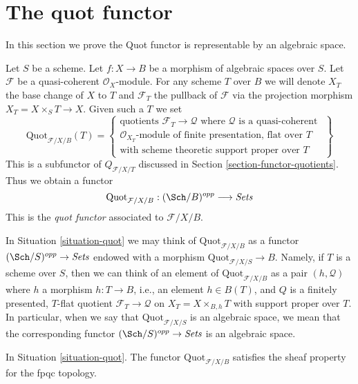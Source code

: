 \section{The quot functor}
\label{section-quot}

\noindent
In this section we prove the Quot functor is representable by
an algebraic space.

\begin{situation}
\label{situation-quot}
Let $S$ be a scheme. Let $f : X \to B$ be a morphism of
algebraic spaces  over $S$. Let $\mathcal{F}$ be a quasi-coherent
$\mathcal{O}_X$-module.
For any scheme $T$ over $B$ we will denote $X_T$ the base change of
$X$ to $T$ and $\mathcal{F}_T$ the pullback
of $\mathcal{F}$ via the projection morphism $X_T = X \times_S T \to X$.
Given such a $T$ we set
$$
\text{Quot}_{\mathcal{F}/X/B}(T) =
\left\{
\begin{matrix}
\text{quotients }\mathcal{F}_T \to \mathcal{Q}\text{ where }
\mathcal{Q}\text{ is a quasi-coherent }\\
\mathcal{O}_{X_T}\text{-module of finite presentation, flat over }T\\
\text{with scheme theoretic support proper over }T
\end{matrix}
\right\}
$$
This is a subfunctor of $Q_{\mathcal{F}/X/T}$ discussed in
Section \ref{section-functor-quotients}. Thus we obtain a functor
\begin{equation}
\label{equation-quot}
\text{Quot}_{\mathcal{F}/X/B} : (\Sch/B)^{opp} \longrightarrow \textit{Sets}
\end{equation}
This is the {\it quot functor} associated to $\mathcal{F}/X/B$.
\end{situation}

\noindent
In Situation \ref{situation-quot} we may think of
$\text{Quot}_{\mathcal{F}/X/B}$ as a functor
$(\Sch/S)^{opp} \to \textit{Sets}$ endowed
with a morphism $\text{Quot}_{\mathcal{F}/X/S} \to B$.
Namely, if $T$ is a scheme over $S$, then we can think of an element
of $\text{Quot}_{\mathcal{F}/X/B}$ as a pair $(h, \mathcal{Q})$
where $h$ a morphism $h : T \to B$, i.e., an element $h \in B(T)$,
and $Q$ is a finitely presented, $T$-flat quotient
$\mathcal{F}_T \to \mathcal{Q}$ on $X_T = X \times_{B, h} T$
with support proper over $T$. In particular, when we say
that $\text{Quot}_{\mathcal{F}/X/S}$ is an algebraic space, we mean that the
corresponding functor $(\Sch/S)^{opp} \to \textit{Sets}$ is an algebraic space.

\begin{lemma}
\label{lemma-quot-sheaf}
In Situation \ref{situation-quot}. The functor $\text{Quot}_{\mathcal{F}/X/B}$
satisfies the sheaf property for the fpqc topology.
\end{lemma}

